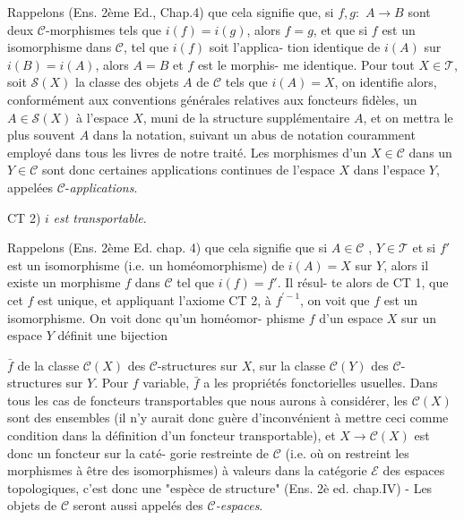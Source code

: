 Rappelons (Ens. 2ème Ed., Chap.4) que cela signifie que, si $f, g :$
$A \to B$ sont deux $\mathcal{C}$-morphismes tels que $i(f) = i(g)$, alors $f = g$,
et que si $f$ est un isomorphisme dans $\mathcal{C}$, tel que $i(f)$ soit l'applica-
tion identique de $i(A)$ sur $i(B) = i(A)$, alors $A = B$ et $f$ est le morphis-
me identique. Pour tout $X \in \mathcal{T}$, soit $\mathcal{S}(X)$ la classe des objets $A$ de $\mathcal{C}$
tels que $i(A) = X$, on identifie alors, conformément aux conventions
générales relatives aux foncteurs fidèles, un $A \in \mathcal{S}(X)$ à l'espace $X$,
muni de la structure supplémentaire $A$, et on mettra le plus souvent
$A$ dans la notation, suivant un abus de notation couramment employé dans
tous les livres de notre traité. Les morphismes d'un $X \in \mathcal{C}$ dans un $Y \in \mathcal{C}$
sont donc certaines applications continues de l'espace $X$ dans l'espace
$Y$, appelées $\mathcal{C}$-\emph{applications}.

CT 2) $i$ \emph{est transportable}.

Rappelons (Ens. 2ème Ed. chap. 4) que cela signifie que si $A \in \mathcal{C}$ ,
$Y \in \mathcal{T}$ et si $f'$ est un isomorphisme (i.e. un homéomorphisme) de $i(A) = X$
sur $Y$, alors il existe un morphisme $f$ dans $\mathcal{C}$ tel que $i(f) = f'$. Il résul-
te alors de CT 1, que cet $f$ est unique, et appliquant l'axiome CT 2, à
$f^{\prime -1}$, on voit que $f$ est un isomorphisme. On voit donc qu'un homéomor-
phisme $f$ d'un espace $X$ sur un espace $Y$ définit une bijection

\newpage



$\bar{f}$ de la classe $\mathcal{C}(X)$ des $\mathcal{C}$-structures sur $X$, sur la classe $\mathcal{C}(Y)$ des
$\mathcal{C}$-structures sur $Y$. Pour $f$ variable, $\bar{f}$ a les propriétés fonctorielles
usuelles. Dans tous les cas de foncteurs transportables que nous aurons
à considérer, les $\mathcal{C}(X)$ sont des ensembles (il n'y aurait donc guère
d'inconvénient à mettre ceci comme condition dans la définition d'un
foncteur transportable), et $X \to \mathcal{C}(X)$ est donc un foncteur sur la caté-
gorie restreinte de $\mathcal{C}$ (i.e. où on restreint les morphismes à être des
isomorphismes) à valeurs dans la catégorie $\mathcal{E}$ des espaces topologiques,
c'est donc une "espèce de structure" (Ens. 2è ed. chap.IV) - Les objets
de $\mathcal{C}$ seront aussi appelés des \emph{$\mathcal{C}$-espaces}.

